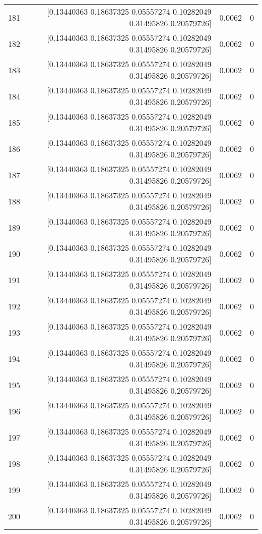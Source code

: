 \begin{longtable}{lrrr}
181 & [0.13440363 0.18637325 0.05557274 0.10282049 0.31495826 0.20579726] & 0.0062 & 0 \\
182 & [0.13440363 0.18637325 0.05557274 0.10282049 0.31495826 0.20579726] & 0.0062 & 0 \\
183 & [0.13440363 0.18637325 0.05557274 0.10282049 0.31495826 0.20579726] & 0.0062 & 0 \\
184 & [0.13440363 0.18637325 0.05557274 0.10282049 0.31495826 0.20579726] & 0.0062 & 0 \\
185 & [0.13440363 0.18637325 0.05557274 0.10282049 0.31495826 0.20579726] & 0.0062 & 0 \\
186 & [0.13440363 0.18637325 0.05557274 0.10282049 0.31495826 0.20579726] & 0.0062 & 0 \\
187 & [0.13440363 0.18637325 0.05557274 0.10282049 0.31495826 0.20579726] & 0.0062 & 0 \\
188 & [0.13440363 0.18637325 0.05557274 0.10282049 0.31495826 0.20579726] & 0.0062 & 0 \\
189 & [0.13440363 0.18637325 0.05557274 0.10282049 0.31495826 0.20579726] & 0.0062 & 0 \\
190 & [0.13440363 0.18637325 0.05557274 0.10282049 0.31495826 0.20579726] & 0.0062 & 0 \\
191 & [0.13440363 0.18637325 0.05557274 0.10282049 0.31495826 0.20579726] & 0.0062 & 0 \\
192 & [0.13440363 0.18637325 0.05557274 0.10282049 0.31495826 0.20579726] & 0.0062 & 0 \\
193 & [0.13440363 0.18637325 0.05557274 0.10282049 0.31495826 0.20579726] & 0.0062 & 0 \\
194 & [0.13440363 0.18637325 0.05557274 0.10282049 0.31495826 0.20579726] & 0.0062 & 0 \\
195 & [0.13440363 0.18637325 0.05557274 0.10282049 0.31495826 0.20579726] & 0.0062 & 0 \\
196 & [0.13440363 0.18637325 0.05557274 0.10282049 0.31495826 0.20579726] & 0.0062 & 0 \\
197 & [0.13440363 0.18637325 0.05557274 0.10282049 0.31495826 0.20579726] & 0.0062 & 0 \\
198 & [0.13440363 0.18637325 0.05557274 0.10282049 0.31495826 0.20579726] & 0.0062 & 0 \\
199 & [0.13440363 0.18637325 0.05557274 0.10282049 0.31495826 0.20579726] & 0.0062 & 0 \\
200 & [0.13440363 0.18637325 0.05557274 0.10282049 0.31495826 0.20579726] & 0.0062 & 0 \\

\end{longtable}
